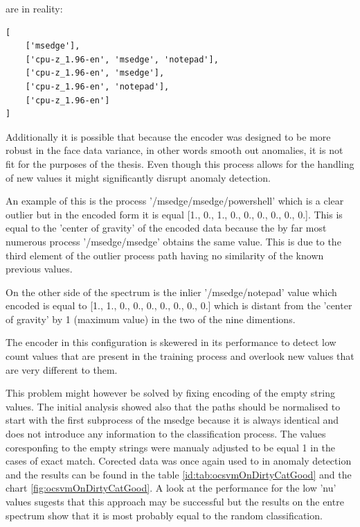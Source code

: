 \documentclass[a4paper,twoside,12pt]{book}
\begin{document}
are in reality:

\begin{lstlisting}
[
	['msedge'],
	['cpu-z_1.96-en', 'msedge', 'notepad'],
	['cpu-z_1.96-en', 'msedge'],
	['cpu-z_1.96-en', 'notepad'],
	['cpu-z_1.96-en']
]
\end{lstlisting}

Additionally it is possible that because the encoder was designed to be more robust in the face 
data variance, in other words smooth out anomalies, it is not fit for the purposes of the thesis. 
Even though this process allows for the handling of new values it might significantly disrupt anomaly detection.

An example of this is the process '/msedge/msedge/powershell' which is a clear outlier
but in the encoded form it is equal [1., 0., 1., 0., 0., 0., 0., 0., 0.]. This is equal
to the 'center of gravity' of the encoded data because the by far most numerous process
'/msedge/msedge' obtains the same value. This is due to the third element of the outlier process  
path having no similarity of the known previous values.

On the other side of the spectrum is the inlier '/msedge/notepad' value which encoded is equal to
[1., 1., 0., 0., 0., 0., 0., 0., 0.] which is distant from the 'center of gravity' by 1 (maximum 
value) in the two of the nine dimentions. 

The encoder in this configuration is skewered in its performance to detect low count values that
are present in the training process and overlook new values that are very different to them. 

This problem might however be solved by fixing encoding of the empty string values. The
initial analysis showed also that the paths should be normalised to start with the first 
subprocess of the msedge because it is always identical and does not introduce any information
to the classification process. The values coresponfing to the empty strings were manualy adjusted
to be equal 1 in the cases of exact match. Corected data was once again used to in anomaly detection
and the results can be found in the table \ref{id:tab:ocsvmOnDirtyCatGood} and the chart \ref{fig:ocsvmOnDirtyCatGood}. 
A look at the performance for the low 'nu' values sugests that this approach may be successful but 
the results on the entre spectrum show that it is most probably equal to the random classification.
\end{document}
